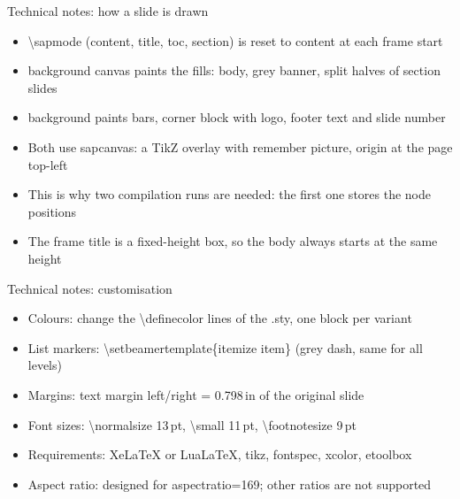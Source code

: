 \documentclass[t,aspectratio=169]{beamer}
\newcommand{\code}[1]{{\ttfamily\small #1}}
\begin{document}
\begin{frame}{Technical notes: how a slide is drawn}
  \small
  \begin{itemize}
    \item \code{\textbackslash sapmode} (\code{content}, \code{title}, \code{toc}, \code{section}) is reset to \code{content} at each frame start
    \item \code{background canvas} paints the fills: body, grey banner, split halves of section slides
    \item \code{background} paints bars, corner block with logo, footer text and slide number
    \item Both use \code{sapcanvas}: a TikZ overlay with \code{remember picture}, origin at the page top-left
    \item This is why two compilation runs are needed: the first one stores the node positions
    \item The frame title is a fixed-height box, so the body always starts at the same height
  \end{itemize}
\end{frame}

\begin{frame}{Technical notes: customisation}
  \small
  \begin{itemize}
    \item Colours: change the \code{\textbackslash definecolor} lines of the \code{.sty}, one block per variant
    \item List markers: \code{\textbackslash setbeamertemplate\{itemize item\}} (grey dash, same for all levels)
    \item Margins: \code{text margin left/right} = 0.798\,in of the original slide
    \item Font sizes: \code{\textbackslash normalsize} 13\,pt, \code{\textbackslash small} 11\,pt, \code{\textbackslash footnotesize} 9\,pt
    \item Requirements: XeLaTeX or LuaLaTeX, \code{tikz}, \code{fontspec}, \code{xcolor}, \code{etoolbox}
    \item Aspect ratio: designed for \code{aspectratio=169}; other ratios are not supported
  \end{itemize}
\end{frame}
\end{document}
